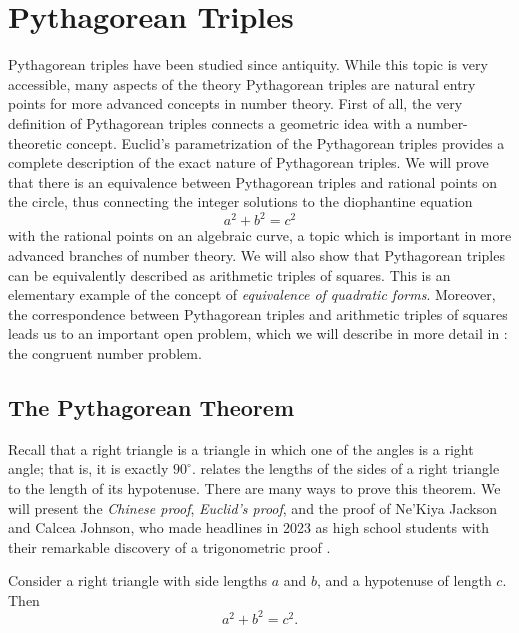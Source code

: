 \chapter{Pythagorean Triples}

Pythagorean triples have been studied since antiquity. While this topic is very accessible, many aspects of the theory Pythagorean triples are natural entry points for more advanced concepts in number theory. First of all, the very definition of Pythagorean triples connects a geometric idea with a number-theoretic concept. Euclid's parametrization of the Pythagorean triples provides a complete description of the exact nature of Pythagorean triples. We will prove that there is an equivalence between Pythagorean triples and rational points on the circle, thus connecting the integer solutions to the diophantine equation
\begin{equation*}
  a^2+b^2=c^2
\end{equation*}
with the rational points on an algebraic curve, a topic which is important in more advanced branches of number theory. We will also show that Pythagorean triples can be equivalently described as arithmetic triples of squares. This is an elementary example of the concept of \emph{equivalence of quadratic forms}. Moreover, the correspondence between Pythagorean triples and arithmetic triples of squares leads us to an important open problem, which we will describe in more detail in : the congruent number problem.

\section{The Pythagorean Theorem}

Recall that a right triangle is a triangle in which one of the angles is a right angle; that is, it is exactly $90^\circ$.  relates the lengths of the sides of a right triangle to the length of its hypotenuse. There are many ways to prove this theorem. We will present the \emph{Chinese proof}, \emph{Euclid's proof}, and the proof of Ne'Kiya Jackson and Calcea Johnson, who made headlines in 2023 as high school students with their remarkable discovery of a trigonometric proof \cite{theguardian2023}.

\begin{theorem}\label{theorem:pythagorean-theorem}
  Consider a right triangle with side lengths $a$ and $b$, and a hypotenuse of length $c$. Then
  \begin{equation*}
    a^2 + b^2 = c^2.
  \end{equation*}
\end{theorem}

